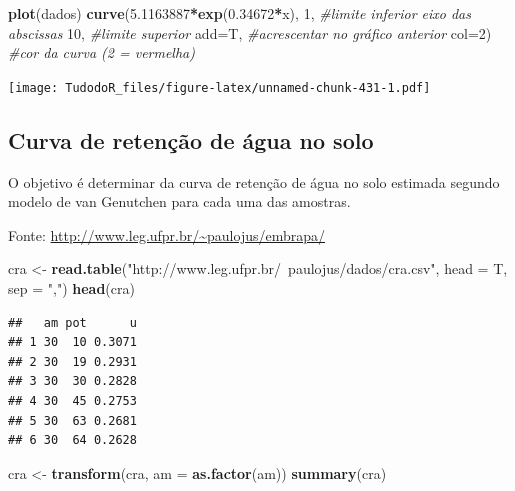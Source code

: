 \documentclass[
]{book}
\newenvironment{Shaded}{\begin{snugshade}}{\end{snugshade}}
\newcommand{\CommentTok}[1]{\textcolor[rgb]{0.56,0.35,0.01}{\textit{#1}}}
\newcommand{\DataTypeTok}[1]{\textcolor[rgb]{0.13,0.29,0.53}{#1}}
\newcommand{\DecValTok}[1]{\textcolor[rgb]{0.00,0.00,0.81}{#1}}
\newcommand{\FloatTok}[1]{\textcolor[rgb]{0.00,0.00,0.81}{#1}}
\newcommand{\KeywordTok}[1]{\textcolor[rgb]{0.13,0.29,0.53}{\textbf{#1}}}
\newcommand{\NormalTok}[1]{#1}
\newcommand{\OperatorTok}[1]{\textcolor[rgb]{0.81,0.36,0.00}{\textbf{#1}}}
\newcommand{\StringTok}[1]{\textcolor[rgb]{0.31,0.60,0.02}{#1}}
\begin{document}
\begin{Shaded}
\begin{Highlighting}[]
\KeywordTok{plot}\NormalTok{(dados) }
\KeywordTok{curve}\NormalTok{(}\FloatTok{5.1163887}\OperatorTok{*}\KeywordTok{exp}\NormalTok{(}\FloatTok{0.34672}\OperatorTok{*}\NormalTok{x), }\DecValTok{1}\NormalTok{, }\CommentTok{#limite inferior eixo das abscissas}
      \DecValTok{10}\NormalTok{, }\CommentTok{#limite superior}
      \DataTypeTok{add=}\NormalTok{T, }\CommentTok{#acrescentar no gráfico anterior }
      \DataTypeTok{col=}\DecValTok{2}\NormalTok{) }\CommentTok{#cor da curva (2 = vermelha)}
\end{Highlighting}
\end{Shaded}

\texttt{[image: TudodoR\_files/figure-latex/unnamed-chunk-431-1.pdf]}

\hypertarget{curva-de-retenuxe7uxe3o-de-uxe1gua-no-solo}{%
\subsection{Curva de retenção de água no solo}\label{curva-de-retenuxe7uxe3o-de-uxe1gua-no-solo}}

O objetivo é determinar da curva de retenção de água no solo estimada segundo modelo de van Genutchen para cada uma das amostras.

Fonte: \url{http://www.leg.ufpr.br/~paulojus/embrapa/}

\begin{Shaded}
\begin{Highlighting}[]
\NormalTok{cra <-}\StringTok{ }\KeywordTok{read.table}\NormalTok{(}\StringTok{"http://www.leg.ufpr.br/~paulojus/dados/cra.csv"}\NormalTok{, }\DataTypeTok{head =}\NormalTok{ T, }\DataTypeTok{sep =} \StringTok{","}\NormalTok{) }
\KeywordTok{head}\NormalTok{(cra)}
\end{Highlighting}
\end{Shaded}

\begin{verbatim}
##   am pot      u
## 1 30  10 0.3071
## 2 30  19 0.2931
## 3 30  30 0.2828
## 4 30  45 0.2753
## 5 30  63 0.2681
## 6 30  64 0.2628
\end{verbatim}

\begin{Shaded}
\begin{Highlighting}[]
\NormalTok{cra <-}\StringTok{ }\KeywordTok{transform}\NormalTok{(cra, }\DataTypeTok{am =} \KeywordTok{as.factor}\NormalTok{(am)) }
\KeywordTok{summary}\NormalTok{(cra)}
\end{Highlighting}
\end{Shaded}
\end{document}
